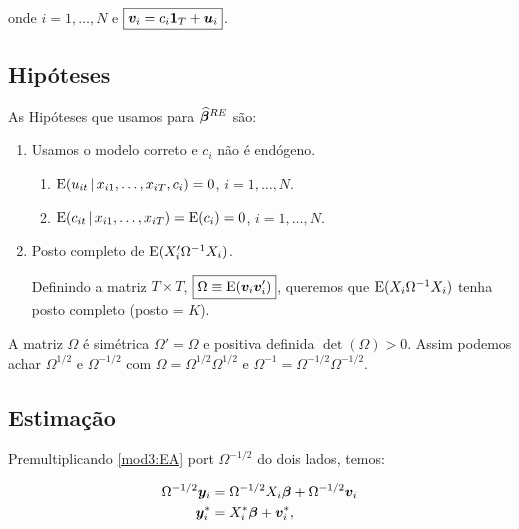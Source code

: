 \documentclass[11pt, oneside, a4paper, article]{article}
\numberwithin{equation}{section}
\begin{document}
\begin{description}
\noindent
onde
$i = 1, \dots, N$ e $\boxed{\boldsymbol{v}_{i} = c_{i} \boldsymbol{1}_{T} + \boldsymbol{u}_{i}}$.

\subsection{Hipóteses}

As Hipóteses que usamos para $\boldsymbol{\widehat{\beta}}^{RE}$ são:

\begin{enumerate} \itemsep0pt
\item  
Usamos o modelo correto e $c_{i}$ não é endógeno.

\begin{enumerate}[label =\alph*)]
\item 
	$\text{E}( u_{it} \, | \,  x_{i1}, \dots, x_{iT}, c_{i} ) = 0$,
	$i = 1, \dots, N$.
\item        
	$\text{E}( c_{it} \, | \, x_{i1}, \dots, x_{iT} ) = \text{E}( c_{i} ) = 0$,
	$i = 1, \dots, N$.
\end{enumerate}

\item  Posto completo de $\text{E}( X_{i}' \Omega^{-1} X_{i} )$.

Definindo a matriz $T \times T$, $\boxed{\Omega \equiv \text{E}(\boldsymbol{v}_{i} \boldsymbol{v}_{i}')}$, queremos que $\text{E}( X_{i} \Omega^{-1} X_{i} )$ tenha posto completo (posto = $K$).
\end{enumerate}

A matriz $\Omega$ é simétrica $\Omega' = \Omega$ e positiva definida $\det(\Omega) > 0$.
Assim podemos achar $\Omega^{1/2}$ e $\Omega^{-1/2}$ com $\Omega = \Omega^{1/2} \Omega^{1/2}$ e $\Omega^{-1} = \Omega^{-1/2} \Omega^{-1/2}$.

\subsection{Estimação}

Premultiplicando \eqref{mod3:EA} port $\Omega^{-1/2}$ do dois lados, temos:

\vspace{-1 em}
\begin{align} 
\notag
\Omega^{-1/2}\boldsymbol{y}_{i} &= \Omega^{-1/2}X_{i} \boldsymbol{\beta} + \Omega^{-1/2}\boldsymbol{v}_{i}
\\
\label{mod4:EA}
\boldsymbol{y}_{i}^{*} &= X_{i}^{*} \boldsymbol{\beta} + \boldsymbol{v}_{i}^{*},
\end{align}


\end{description}
\end{document}

